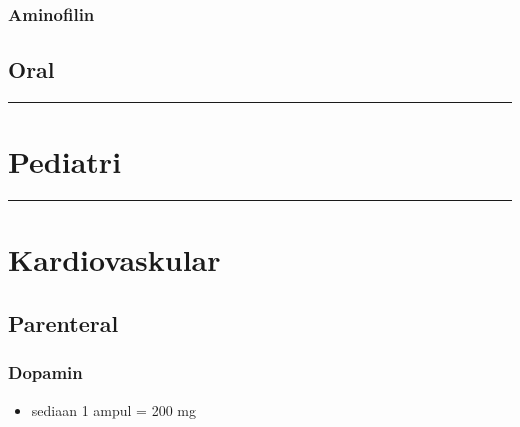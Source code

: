 \documentclass[
]{book}
\providecommand{\tightlist}{%
  \setlength{\itemsep}{0pt}\setlength{\parskip}{0pt}}
\begin{document}
\hypertarget{aminofilin}{%
\subsubsection{Aminofilin}\label{aminofilin}}

\hypertarget{oral-1}{%
\subsection{Oral}\label{oral-1}}

\begin{center}\rule{0.5\linewidth}{0.5pt}\end{center}

\hypertarget{pediatri-2}{%
\section{Pediatri}\label{pediatri-2}}

\begin{center}\rule{0.5\linewidth}{0.5pt}\end{center}

\hypertarget{kardiovaskular-3}{%
\section{Kardiovaskular}\label{kardiovaskular-3}}

\hypertarget{parenteral-2}{%
\subsection{Parenteral}\label{parenteral-2}}

\hypertarget{dopamin}{%
\subsubsection{Dopamin}\label{dopamin}}

\begin{itemize}
\tightlist
\item
  sediaan 1 ampul = 200 mg
\end{itemize}
\end{document}
